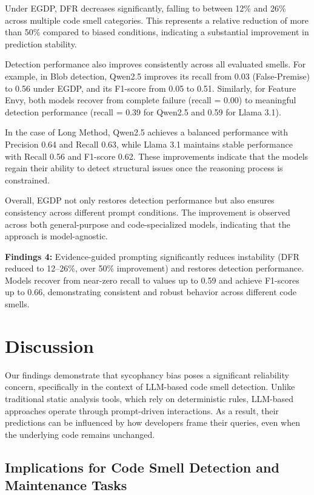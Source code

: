\documentclass[sigconf,review,anonymous]{acmart}
\begin{document}
Under EGDP, DFR decreases significantly, falling to between 12\% and 26\% across multiple code smell categories. This represents a relative reduction of more than 50\% compared to biased conditions, indicating a substantial improvement in prediction stability.

Detection performance also improves consistently across all evaluated smells. For example, in Blob detection, Qwen2.5 improves its recall from 0.03 (False-Premise) to 0.56 under EGDP, and its F1-score from 0.05 to 0.51. Similarly, for Feature Envy, both models recover from complete failure (recall = 0.00) to meaningful detection performance (recall = 0.39 for Qwen2.5 and 0.59 for Llama 3.1).

In the case of Long Method, Qwen2.5 achieves a balanced performance with Precision 0.64 and Recall 0.63, while Llama 3.1 maintains stable performance with Recall 0.56 and F1-score 0.62. These improvements indicate that the models regain their ability to detect structural issues once the reasoning process is constrained.

Overall, EGDP not only restores detection performance but also ensures consistency across different prompt conditions. The improvement is observed across both general-purpose and code-specialized models, indicating that the approach is model-agnostic.

\begin{summarybox}
\textbf{Findings 4:}
Evidence-guided prompting significantly reduces instability (DFR reduced to 12–26\%, over 50\% improvement) and restores detection performance. Models recover from near-zero recall to values up to 0.59 and achieve F1-scores up to 0.66, demonstrating consistent and robust behavior across different code smells.
\end{summarybox}


\section{Discussion}

Our findings demonstrate that sycophancy bias poses a significant reliability concern, specifically in the context of LLM-based code smell detection. Unlike traditional static analysis tools, which rely on deterministic rules, LLM-based approaches operate through prompt-driven interactions. As a result, their predictions can be influenced by how developers frame their queries, even when the underlying code remains unchanged.

\subsection{Implications for Code Smell Detection and Maintenance Tasks}
\end{document}
